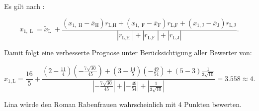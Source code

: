 \documentclass{article}
\begin{document}
\begin{enumerate}[a.]
Es gilt nach \textcite{geyer-schulz_sonnenbichler_2019}:

$$
x_{1, \text { L }}=\tilde{x}_{\text {L }}+\frac{\left(x_{1, \text { H}}-\bar{x}_{\text {H}}\right) r_{\text {L,H}} + \left(x_{1, \text { F}}-\bar{x}_{\text {F}}\right) r_{\text {L,F}}+\left(x_{1, \text {J}}-\bar{x}_{\text {J}}\right) r_{\text {L,J}}}{\left|r_{\text {L,H }}\right| + \left|r_{\text {L,F }}\right|+\left| r_{\text {L,J}}\right|}.
$$

Damit folgt eine verbesserte Prognose unter Berücksichtigung aller Bewerter von:

$$
x_{1, \text{L}}=\frac{16}{5}+\frac{\left(2-\frac{11}{4}\right) \left(-\frac{7\sqrt{30}}{45}\right) + \left(3-\frac{14}{5}\right) \left(-\frac{49}{54}\right) +\left(5-3\right) \frac{1}{3 \sqrt{10}}}{|-\frac{7\sqrt{30}}{45}| + |-\frac{49}{54}|+|\frac{1}{3 \sqrt{10}}|}=3.558 \approx 4.
$$

\end{enumerate}    

Lina würde den Roman Rabenfrauen wahrscheinlich mit 4 Punkten bewerten.

\printbibliography
\end{document}
